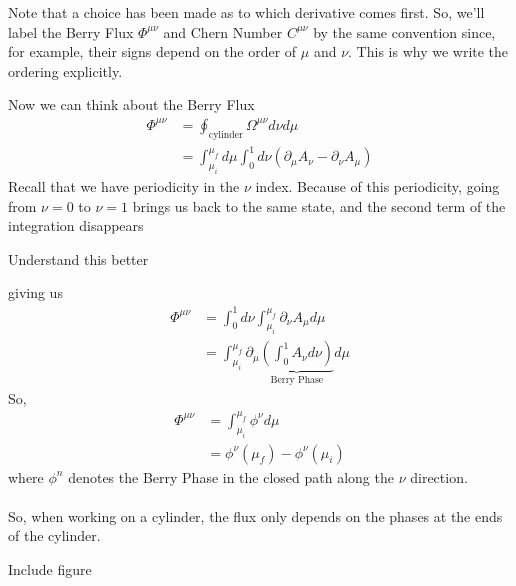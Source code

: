 \documentclass[11pt]{article}
\begin{document}
\begin{remark}
  {Note that a choice has been made as to which derivative comes first. So, we'll label the Berry Flux $\Phi^{\mu \nu}$ and Chern Number $C^{\mu \nu}$ by the same convention since, for example, their signs depend on the order of $\mu$ and $\nu$. This is why we write the ordering explicitly.}
\end{remark} Now we can think about the Berry Flux 
\begin{align*}
  \Phi^{\mu \nu} &= \oint_{\text{cylinder}} \Omega^{\mu \nu} d\nu d\mu \\
  &= \int_{\mu_i}^{\mu_f} d\mu \int_{0}^{1} d\nu \left(\partial_{\mu} A_{\nu} - \partial_{\nu} A_{\mu}\right) 
\end{align*} Recall that we have periodicity in the $\nu$ index. Because of this periodicity, going from $\nu = 0$ to $\nu = 1$ brings us back to the same state, and the second term of the integration disappears \begin{note}
{Understand this better}
\end{note} giving us 
\begin{align*}
  \Phi^{\mu \nu} &= \int_{0}^{1} d\nu \int_{\mu_i}^{\mu_f} \partial_{\nu} A_{\mu} d\mu \\
  &= \int_{\mu_{i}}^{\mu_{f}} \partial_{\mu} \underbrace{\left( \int_{0}^{1} A_{\nu} d\nu\right)}_{\text{Berry Phase}} d\mu
\end{align*} So,
\begin{align*}
  \Phi^{\mu \nu} &= \int_{\mu_i}^{\mu_f} \phi^{\nu} d\mu \\
  &= \phi^{\nu}(\mu_f) - \phi^{\nu}(\mu_i)
\end{align*} where $\phi^n$ denotes the Berry Phase in the closed path along the $\nu$ direction.
\\
\\
So, when working on a cylinder, the flux only depends on the phases at the ends of the cylinder. 

\begin{center}
  Include figure
\end{center}

\vskip 1cm
\end{document}
